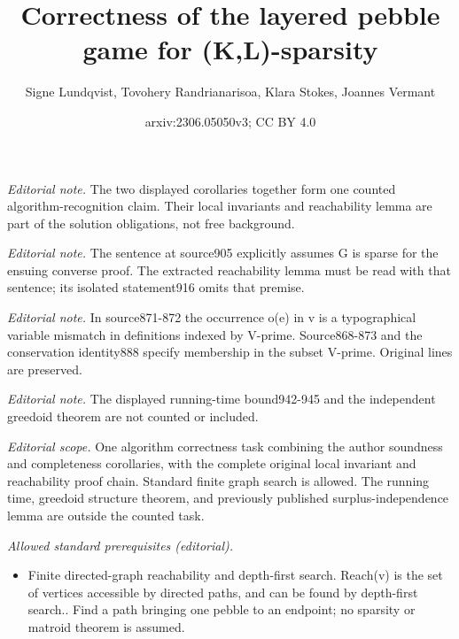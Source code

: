 \documentclass[10pt,a4paper]{article}
\title{Correctness of the layered pebble game for (K,L)-sparsity}
\author{Signe Lundqvist, Tovohery Randrianarisoa, Klara Stokes, Joannes Vermant}
\date{arxiv:2306.05050v3; CC BY 4.0}
\begin{document}
\maketitle
\noindent\textit{Editorial note.} The two displayed corollaries together form one counted algorithm-recognition claim. Their local invariants and reachability lemma are part of the solution obligations, not free background.\par\medskip
\noindent\textit{Editorial note.} The sentence at source905 explicitly assumes G is sparse for the ensuing converse proof. The extracted reachability lemma must be read with that sentence; its isolated statement916 omits that premise.\par\medskip
\noindent\textit{Editorial note.} In source871-872 the occurrence o(e) in v is a typographical variable mismatch in definitions indexed by V-prime. Source868-873 and the conservation identity888 specify membership in the subset V-prime. Original lines are preserved.\par\medskip
\noindent\textit{Editorial note.} The displayed running-time bound942-945 and the independent greedoid theorem are not counted or included.\par\medskip
\noindent\textit{Editorial scope.} One algorithm correctness task combining the author soundness and completeness corollaries, with the complete original local invariant and reachability proof chain. Standard finite graph search is allowed. The running time, greedoid structure theorem, and previously published surplus-independence lemma are outside the counted task.\par\medskip
\noindent\textit{Allowed standard prerequisites (editorial).}\begin{itemize}
\item Finite directed-graph reachability and depth-first search. Reach(v) is the set of vertices accessible by directed paths, and can be found by depth-first search.. Find a path bringing one pebble to an endpoint; no sparsity or matroid theorem is assumed.
\end{itemize}\medskip
\end{document}
